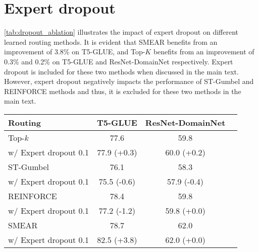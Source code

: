 \documentclass{article}
\theoremstyle{plain}
\theoremstyle{definition}
\theoremstyle{remark}
\begin{document}
\section{Expert dropout}
\label{sec:expert_dropout}
\cref{tab:dropout_ablation} illustrates the impact of expert dropout on different learned routing methods. 
It is evident that SMEAR benefits from an improvement of 3.8\% on T5-GLUE, and Top-$K$ benefits from an improvement of 0.3\% and 0.2\% on T5-GLUE and ResNet-DomainNet respectively. 
Expert dropout is included for these two methods when discussed in the main text.
However, expert dropout negatively impacts the performance of ST-Gumbel and REINFORCE methods and thus, it is excluded for these two methods in the main text.

\begin{tabular}{l c c c}
  \toprule
  Routing & T5-GLUE & ResNet-DomainNet\\
  \midrule
  Top-$k$ & 77.6 & 59.8 \\
  \; w/ Expert dropout 0.1 & 77.9 (+0.3) & 60.0 (+0.2)\\
  ST-Gumbel & 76.1 & 58.3 \\
  \; w/ Expert dropout 0.1 & 75.5 (-0.6)& 57.9 (-0.4)\\
  REINFORCE & 78.4 & 59.8 \\  
  \; w/ Expert dropout 0.1 & 77.2 (-1.2)& 59.8 (+0.0)\\
  SMEAR & 78.7 & 62.0 \\
  \; w/ Expert dropout 0.1 & 82.5 (+3.8)& 62.0 (+0.0)\\
  \bottomrule
\end{tabular}
\label{tab:dropout_ablation}
\end{document}
